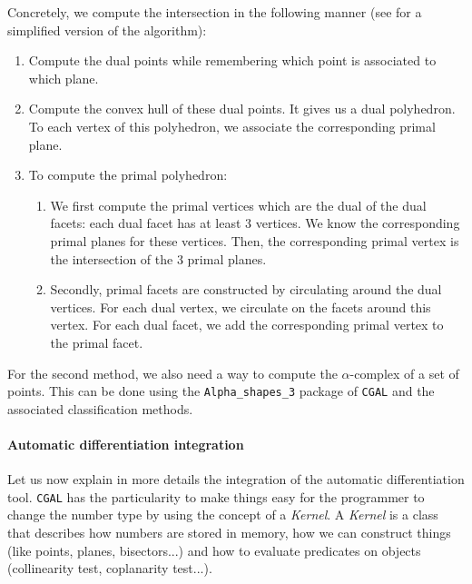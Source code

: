 Concretely, we compute the intersection in the following manner (see
 for a simplified version of the
algorithm):
\begin{enumerate}
    \item Compute the dual points while remembering which point is associated to
        which plane.
    \item Compute the convex hull of these dual points. It gives us a dual
        polyhedron. To each vertex of this polyhedron, we associate the
        corresponding primal plane.
    \item To compute the primal polyhedron:
        \begin{enumerate}
            \item We first compute the primal vertices which are the dual of the
                dual facets: each dual facet has at least 3 vertices. We know
                the corresponding primal planes for these vertices.  Then, the
                corresponding primal vertex is the intersection of the 3 primal
                planes.
            \item Secondly, primal facets are constructed by circulating
                around the dual vertices. For each dual vertex, we circulate
                on the facets around this vertex. For each dual facet, we add the
                corresponding primal vertex to the primal facet.
        \end{enumerate}
\end{enumerate}

For the second method, we also need a way to compute the $\alpha$-complex of a
set of points. This can be done using the \texttt{Alpha\_shapes\_3} package of
\texttt{CGAL} and the associated classification methods.

\paragraph{Automatic differentiation integration}

Let us now explain in more details the integration of the automatic
differentiation tool. \texttt{CGAL} has the particularity to make things easy
for the programmer to change the number type by using the concept of a
\emph{Kernel}. A \emph{Kernel} is a class that describes how numbers are stored
in memory, how we can construct things (like points, planes, bisectors...) and
how to evaluate predicates on objects (collinearity test, coplanarity test...).

